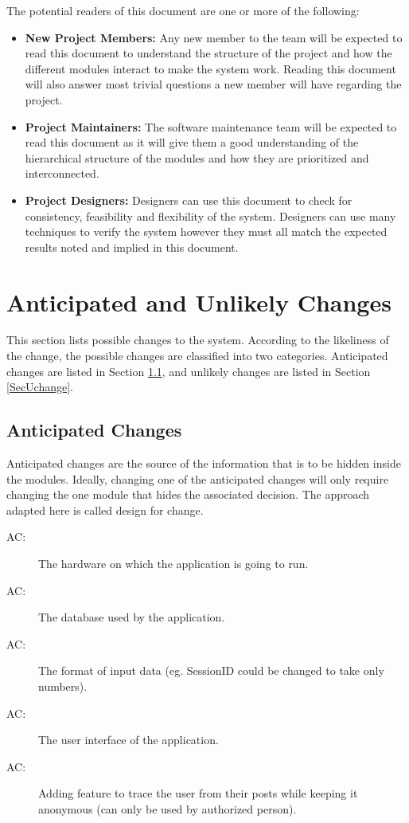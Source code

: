 \documentclass[12pt, titlepage]{article}
\newcounter{acnum}
\newcommand{\actheacnum}{AC\theacnum}
\begin{document}
The potential readers of this document are one or more of the following:
\begin{itemize}
\item \textbf{New Project Members:} Any new member to the team will be expected to read this document to understand the structure of the project and how the different modules interact to make  the system work. Reading this document will also answer most trivial questions a new member will have regarding the project.
\item \textbf{Project Maintainers:} The software maintenance team will be expected to read this document as it will give them a good understanding of the hierarchical structure of the modules and how they are prioritized and interconnected. 
\item \textbf{Project Designers:} Designers can use this document to check for consistency, feasibility and flexibility of the system. Designers can use many techniques to verify the system however they must all match the expected results noted and implied in this document.
\end{itemize}

\section{Anticipated and Unlikely Changes} \label{SecChange}

This section lists possible changes to the system. According to the likeliness
of the change, the possible changes are classified into two
categories. Anticipated changes are listed in Section \ref{SecAchange}, and
unlikely changes are listed in Section \ref{SecUchange}.

\subsection{Anticipated Changes} \label{SecAchange}

Anticipated changes are the source of the information that is to be hidden
inside the modules. Ideally, changing one of the anticipated changes will only
require changing the one module that hides the associated decision. The approach
adapted here is called design for
change.

\begin{description}
\item[ \actheacnum \label{acHardware}:] The hardware on which the application is going to run.
\item[ \actheacnum \label{ac2}:] The database used by the application.
\item[ \actheacnum \label{ac3}:] The format of input data (eg. SessionID could be changed to take only numbers).
\item[ \actheacnum \label{ac4}:] The user interface of the application.
\item[ \actheacnum \label{ac5}:] Adding feature to trace the user from their posts while keeping it anonymous (can only be used by authorized person).
\end{description}
\end{document}
